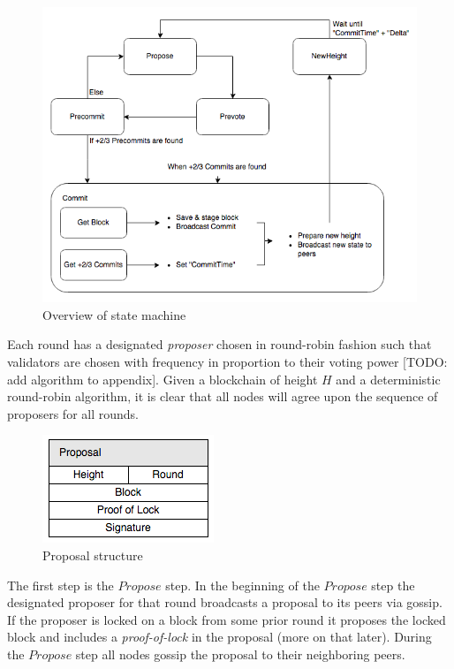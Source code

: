\documentclass[letter,11pt]{article}
\begin{document}
\begin{figure}[H]
 \centering
 \includegraphics[scale=0.5]{figures/statemachine.png}
 \caption{Overview of state machine}
\end{figure}

Each round has a designated \textit{proposer} chosen in round-robin fashion such that validators are chosen with frequency in proportion to their voting power [TODO: add algorithm to appendix].  Given a blockchain of height $H$ and a deterministic round-robin algorithm, it is clear that all nodes will agree upon the sequence of proposers for all rounds.

\begin{figure}[H]
 \centering
 \includegraphics[scale=0.5]{figures/proposal.png}
 \caption{Proposal structure}
\end{figure}

The first step is the $Propose$ step.  In the beginning of the $Propose$ step the designated proposer for that round broadcasts a proposal to its peers via gossip.  If the proposer is locked on a block from some prior round it proposes the locked block and includes a \textit{proof-of-lock} in the proposal (more on that later).  During the $Propose$ step all nodes gossip the proposal to their neighboring peers.\\
\end{document}
